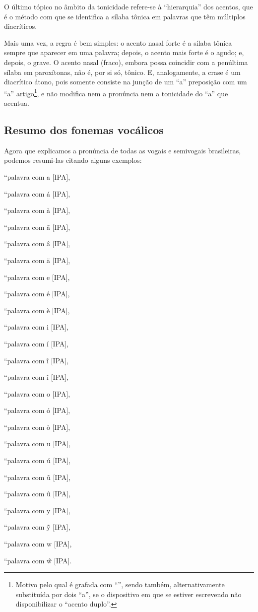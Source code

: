 \documentclass[12pt, a5paper, titlepage]{article}
\begin{document}
\begin{bilingualpages}
    O último tópico no âmbito da tonicidade refere-se à ``hierarquia'' dos acentos, que é o método com que se identifica a sílaba tônica em palavras que têm múltiplos diacríticos.

    Mais uma vez, a regra é bem simples: o acento nasal forte é a sílaba tônica sempre que aparecer em uma palavra; depois, o acento mais forte é o agudo; e, depois, o grave. O acento nasal (fraco), embora possa coincidir com a penúltima sílaba em paroxítonas, não é, por si só, tônico. E, analogamente, a crase é um diacrítico átono, pois somente consiste na junção de um ``a'' preposição com um ``a'' artigo\footnote{Motivo pelo qual é grafada com ``\textasciidieresis'', sendo também, alternativamente substituída por dois ``a'', se o dispositivo em que se estiver escrevendo não disponibilizar o ``acento duplo''.}, e não modifica nem a pronúncia nem a tonicidade do ``a'' que acentua.

    \subsection{Resumo dos fonemas vocálicos}
    Agora que explicamos a pronúncia de todas as vogais e semivogais brasileiras, podemos resumi-las citando alguns exemplos:
    \newline
    \par [não precisa de 1 exemplo por fonema vocálico]
    \par ``palavra com a [IPA],
    \par ``palavra com á [IPA],
    \par ``palavra com à [IPA],
    \par ``palavra com ã [IPA],
    \par ``palavra com â [IPA],
    \par ``palavra com ä [IPA],
    \par ``palavra com e [IPA],
    \par ``palavra com é [IPA],
    \par ``palavra com è [IPA],
    \par ``palavra com i [IPA],
    \par ``palavra com í [IPA],
    \par ``palavra com ĩ [IPA],
    \par ``palavra com î [IPA],
    \par ``palavra com o [IPA],
    \par ``palavra com ó [IPA],
    \par ``palavra com ò [IPA],
    \par ``palavra com u [IPA],
    \par ``palavra com ú [IPA],
    \par ``palavra com ũ [IPA],
    \par ``palavra com û [IPA],
    \par ``palavra com y [IPA],
    \par ``palavra com \~y [IPA],
    \par ``palavra com w [IPA],
    \par ``palavra com \~w [IPA].
    \newline


\end{bilingualpages}
\end{document}
